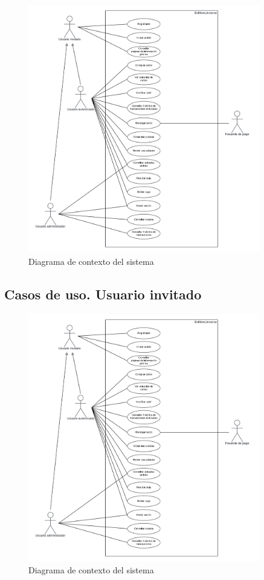 \begin{figure}[H]
    \centering
    \includegraphics[width=0.9\textwidth]{figures/6-Analisis/6-Casos-uso/6_Diagrama-contexto.png}
    \caption{Diagrama de contexto del sistema}
    \label{fig:diagrama_contexto}
\end{figure}

\subsection{Casos de uso. Usuario invitado}

\begin{figure}[H]
  \centering
  \includegraphics[width=0.9\textwidth]{figures/6-Analisis/6-Casos-uso/6_Diagrama-contexto.png}
  \caption{Diagrama de contexto del sistema}
  \label{fig:diagrama_contexto}
\end{figure}

